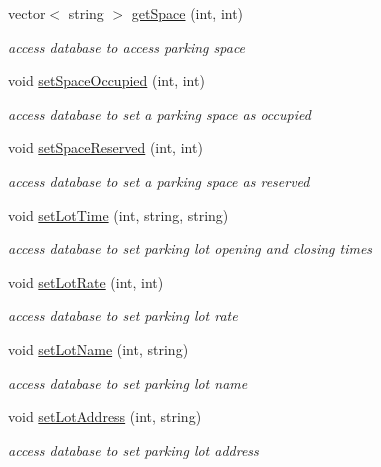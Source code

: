 \begin{DoxyCompactItemize}
vector$<$ string $>$ \mbox{\hyperlink{class_database_proxy_ae62e46fed10eecba9b13afd65874d750}{get\+Space}} (int, int)
\begin{DoxyCompactList}\small\item\em access database to access parking space \end{DoxyCompactList}\item 
void \mbox{\hyperlink{class_database_proxy_aa5efa63f0579939edbd042d194d9f150}{set\+Space\+Occupied}} (int, int)
\begin{DoxyCompactList}\small\item\em access database to set a parking space as occupied \end{DoxyCompactList}\item 
void \mbox{\hyperlink{class_database_proxy_ade2171b0f8da996d516a212692913d59}{set\+Space\+Reserved}} (int, int)
\begin{DoxyCompactList}\small\item\em access database to set a parking space as reserved \end{DoxyCompactList}\item 
void \mbox{\hyperlink{class_database_proxy_a2a2e27f67ff82519fd49c503490083b7}{set\+Lot\+Time}} (int, string, string)
\begin{DoxyCompactList}\small\item\em access database to set parking lot opening and closing times \end{DoxyCompactList}\item 
void \mbox{\hyperlink{class_database_proxy_a68aa4847e1dc937349200241722d411c}{set\+Lot\+Rate}} (int, int)
\begin{DoxyCompactList}\small\item\em access database to set parking lot rate \end{DoxyCompactList}\item 
void \mbox{\hyperlink{class_database_proxy_a963f6ca045641c4f04b9c22b80134e1c}{set\+Lot\+Name}} (int, string)
\begin{DoxyCompactList}\small\item\em access database to set parking lot name \end{DoxyCompactList}\item 
void \mbox{\hyperlink{class_database_proxy_aaf1a1456f4df83fdd72b8b6578e2efa2}{set\+Lot\+Address}} (int, string)
\begin{DoxyCompactList}\small\item\em access database to set parking lot address \end{DoxyCompactList}\end{DoxyCompactItemize}
